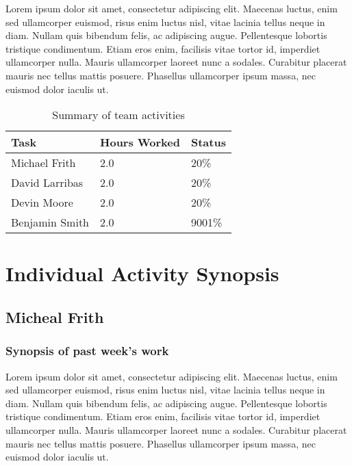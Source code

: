 \documentclass[12pt,journal,compsoc]{IEEEtran}
\begin{document}
Lorem ipsum dolor sit amet, consectetur adipiscing elit. Maecenas luctus, enim sed ullamcorper euismod, risus enim luctus nisl, vitae lacinia tellus neque in diam. Nullam quis bibendum felis, ac adipiscing augue. Pellentesque lobortis tristique condimentum. Etiam eros enim, facilisis vitae tortor id, imperdiet ullamcorper nulla. Mauris ullamcorper laoreet nunc a sodales. Curabitur placerat mauris nec tellus mattis posuere. Phasellus ullamcorper ipsum massa, nec euismod dolor iaculis ut.

\begin{table}[ht]
\renewcommand{\arraystretch}{1.3}
	\caption{Summary of team activities}
	
	\label{Summary of team activities}
	
	\centering
	
	\begin{tabular}{p{5.5cm}|p{1cm}|p{1cm}}

	\hline
	\bfseries 	Task		 		& \bfseries Hours Worked	& \bfseries Status	\\
	\hline
	\hline
				Michael Frith		& 2.0						& 20\%				\\	%
				David Larribas 		& 2.0						& 20\%				\\	
				Devin Moore 		& 2.0						& 20\%				\\	
				Benjamin Smith		& 2.0						& 9001\%			\\	
	\hline
	\end{tabular}
\end{table}

\section{Individual Activity Synopsis}
\subsection{Micheal Frith}

\subsubsection*{Synopsis of past week's work}

Lorem ipsum dolor sit amet, consectetur adipiscing elit. Maecenas luctus, enim sed ullamcorper euismod, risus enim luctus nisl, vitae lacinia tellus neque in diam. Nullam quis bibendum felis, ac adipiscing augue. Pellentesque lobortis tristique condimentum. Etiam eros enim, facilisis vitae tortor id, imperdiet ullamcorper nulla. Mauris ullamcorper laoreet nunc a sodales. Curabitur placerat mauris nec tellus mattis posuere. Phasellus ullamcorper ipsum massa, nec euismod dolor iaculis ut.
\end{document}
